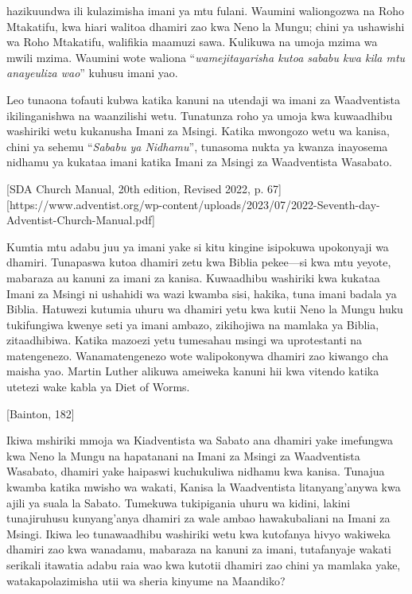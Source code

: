  hazikuundwa ili kulazimisha imani ya mtu fulani. Waumini waliongozwa na Roho Mtakatifu, kwa hiari walitoa dhamiri zao kwa Neno la Mungu; chini ya ushawishi wa Roho Mtakatifu, walifikia maamuzi sawa. Kulikuwa na umoja mzima wa mwili mzima. Waumini wote waliona “\textit{wamejitayarisha kutoa sababu kwa kila mtu anayeuliza wao}” kuhusu imani yao.


Leo tunaona tofauti kubwa katika kanuni na utendaji wa imani za Waadventista ikilinganishwa na waanzilishi wetu. Tunatunza roho ya umoja kwa kuwaadhibu washiriki wetu kukanusha Imani za Msingi. Katika mwongozo wetu wa kanisa, chini ya sehemu “\textit{Sababu ya Nidhamu}”, tunasoma nukta ya kwanza inayosema nidhamu ya kukataa imani katika Imani za Msingi za Waadventista Wasabato.




[SDA Church Manual, 20th edition, Revised 2022, p. 67][https://www.adventist.org/wp-content/uploads/2023/07/2022-Seventh-day-Adventist-Church-Manual.pdf]


Kumtia mtu adabu juu ya imani yake si kitu kingine isipokuwa upokonyaji wa dhamiri. Tunapaswa kutoa dhamiri zetu kwa Biblia pekee—si kwa mtu yeyote, mabaraza au kanuni za imani za kanisa. Kuwaadhibu washiriki kwa kukataa Imani za Msingi ni ushahidi wa wazi kwamba sisi, hakika, tuna imani badala ya Biblia. Hatuwezi kutumia uhuru wa dhamiri yetu kwa kutii Neno la Mungu huku tukifungiwa kwenye seti ya imani ambazo, zikihojiwa na mamlaka ya Biblia, zitaadhibiwa. Katika mazoezi yetu tumesahau msingi wa uprotestanti na matengenezo. Wanamatengenezo wote walipokonywa dhamiri zao kiwango cha maisha yao. Martin Luther alikuwa ameiweka kanuni hii kwa vitendo katika utetezi wake kabla ya Diet of Worms.


[Bainton, 182]


Ikiwa mshiriki mmoja wa Kiadventista wa Sabato ana dhamiri yake imefungwa kwa Neno la Mungu na hapatanani na Imani za Msingi za Waadventista Wasabato, dhamiri yake haipaswi kuchukuliwa nidhamu kwa kanisa. Tunajua kwamba katika mwisho wa wakati, Kanisa la Waadventista litanyang'anywa kwa ajili ya suala la Sabato. Tumekuwa tukipigania uhuru wa kidini, lakini tunajiruhusu kunyang'anya dhamiri za wale ambao hawakubaliani na Imani za Msingi. Ikiwa leo tunawaadhibu washiriki wetu kwa kutofanya hivyo wakiweka dhamiri zao kwa wanadamu, mabaraza na kanuni za imani, tutafanyaje wakati serikali itawatia adabu raia wao kwa kutotii dhamiri zao chini ya mamlaka yake, watakapolazimisha utii wa sheria kinyume na Maandiko?


